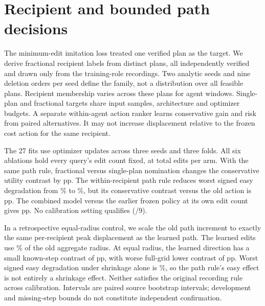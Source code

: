 \section{Recipient and bounded path decisions}
The minimum-edit imitation loss treated one verified plan as the
target. We derive fractional recipient labels from \FactorPathPlans{}
distinct plans, all independently verified and drawn only from the
training-role recordings. Two analytic seeds and nine deletion
orders per seed define the family, not a distribution over all
feasible plans. Recipient membership varies across these plans
for \FactorPathAmbiguous{} agent windows. Single-plan and fractional
targets share input samples, architecture and optimizer budgets.
A separate within-agent action ranker learns conservative gain and
risk from paired alternatives. It may not increase displacement
relative to the frozen cost action for the same recipient.

The 27 fits use \FactorPathUpdates{} optimizer updates across three
seeds and three folds. All six ablations hold every query's edit
count fixed, at \FactorPathEdits{} total edits per arm. With the
same path rule, fractional versus single-plan nomination changes
the conservative utility contrast by \FactorPathSoft{} pp. The
within-recipient path rule reduces worst signed easy degradation
from \FactorPathBaselineWorst\% to \FactorPathWorst\%, but its
conservative contrast versus the old action is \FactorPathPair{} pp.
The combined model versus the earlier frozen policy at its own
edit count gives \FactorPathVersusFrozen{} pp. No calibration
setting qualifies (\FactorPathQual{}/9).

In a retrospective equal-radius control, we scale the old path
increment to exactly the same per-recipient peak displacement as
the learned path. The learned edits use \FactorPathRatio\% of the
old aggregate radius. At equal radius, the learned direction has a
small known-step contrast of \FactorPathShapeKnown{} pp, with worse
full-grid lower contrast of \FactorPathShape{} pp. Worst signed
easy degradation under shrinkage alone is \FactorPathRadiusWorst\%,
so the path rule's easy effect is not entirely a shrinkage effect.
Neither satisfies the original recording rule across calibration.
Intervals are paired source bootstrap intervals; development and
missing-step bounds do not constitute independent confirmation.
